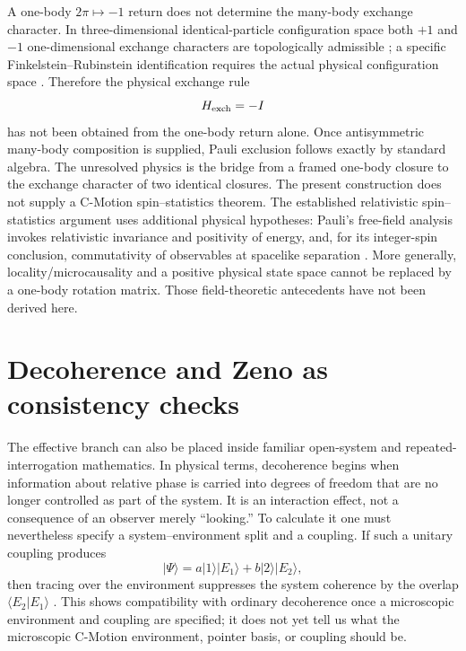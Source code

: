 \documentclass[11pt]{article}
\theoremstyle{definition}
\begin{document}
A one-body $2\pi\mapsto-1$ return does not determine the many-body exchange character.  In
three-dimensional identical-particle configuration space both $+1$ and $-1$ one-dimensional
exchange characters are topologically admissible \cite{LeinaaMyrheim1977}; a specific
Finkelstein--Rubinstein identification requires the actual physical configuration space
\cite{FinkelsteinRubinstein1968}.  Therefore the physical exchange rule
\begin{equation}
 H_{\rm exch}=-I
\end{equation}
has not been obtained from the one-body return alone.  Once antisymmetric many-body
composition is supplied, Pauli exclusion follows exactly by standard algebra.  The unresolved
physics is the bridge from a framed one-body closure to the exchange character of two
identical closures.  The present construction does not supply a C-Motion spin--statistics theorem.
The established relativistic spin--statistics argument uses additional
physical hypotheses: Pauli's free-field analysis invokes relativistic
invariance and positivity of energy, and, for its integer-spin conclusion,
commutativity of observables at spacelike separation
\cite{Pauli1940SpinStatistics}. More generally, locality/microcausality and
a positive physical state space cannot be replaced by a one-body rotation
matrix. Those field-theoretic antecedents have not been derived here.

\section{Decoherence and Zeno as consistency checks}
\label{sec:decozeno}

The effective branch can also be placed inside familiar open-system and repeated-interrogation
mathematics.  In physical terms, decoherence begins when information about relative phase is
carried into degrees of freedom that are no longer controlled as part of the system.  It is an
interaction effect, not a consequence of an observer merely ``looking.''  To calculate it one
must nevertheless specify a system--environment split and a coupling.  If such a unitary
coupling produces
\begin{equation}
 |\Psi\rangle=a|1\rangle|E_1\rangle+b|2\rangle|E_2\rangle,
\end{equation}
then tracing over the environment suppresses the system coherence by the overlap
$\langle E_2|E_1\rangle$ \cite{Zurek2003Decoherence}.  This shows compatibility with ordinary
decoherence once a microscopic environment and coupling are specified; it does not yet tell
us what the microscopic C-Motion environment, pointer basis, or coupling should be.
\end{document}
